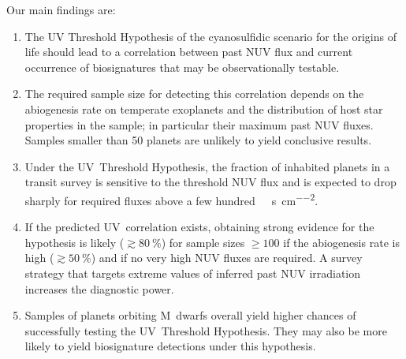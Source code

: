 \documentclass[twocolumn,twocolappendix,linenumbers]{aastex631}
\begin{document}
Our main findings are:
\begin{enumerate}
    \item The UV Threshold Hypothesis of the cyanosulfidic scenario for the origins of life should lead to a correlation between past \gls{NUV} flux and current occurrence of biosignatures that may be observationally testable.
    \item The required sample size for detecting this correlation depends on the abiogenesis rate on temperate exoplanets and the distribution of host star properties in the sample; in particular their maximum past \gls{NUV} fluxes.
    Samples smaller than 50 planets are unlikely to yield conclusive results.
    \item Under the UV~Threshold Hypothesis, the fraction of inhabited planets in a transit survey is sensitive to the threshold \gls{NUV} flux and is expected to drop sharply for required fluxes above a few hundred~\SI{}{\erg\per\second\per\centi\meter\squared}.
    \item If the predicted UV~correlation exists, obtaining strong evidence for the hypothesis is likely ($\gtrsim \SI{80}{\percent}$) for sample sizes $\geq 100$ if the abiogenesis rate is high ($\gtrsim \SI{50}{\percent}$) and if no very high \gls{NUV} fluxes are required.
    A survey strategy that targets extreme values of inferred past \gls{NUV} irradiation increases the diagnostic power.
    \item Samples of planets orbiting M~dwarfs overall yield higher chances of successfully testing the UV~Threshold Hypothesis.
          They may also be more likely to yield biosignature detections under this hypothesis.


\end{enumerate}
\end{document}
